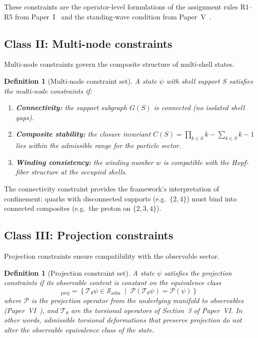 \documentclass[12pt]{article}
\newtheorem{definition}[theorem]{Definition}
\newcommand{\Pcal}{\mathcal{P}}
\newcommand{\Tcal}{\mathcal{T}}
\newcommand{\Sadm}{\mathcal{S}_{\mathrm{adm}}}
\begin{document}
These constraints are the operator-level formulations of the assignment rules R1--R5 from Paper~I~\citep{SmartI} and the standing-wave condition from Paper~V~\citep{SmartV}.

\subsection{Class II: Multi-node constraints}

Multi-node constraints govern the composite structure of multi-shell states.

\begin{definition}[Multi-node constraint set]\label{def:multinode}
A state $\psi$ with shell support $S$ satisfies the multi-node constraints if:
\begin{enumerate}
    \item \textbf{Connectivity:} the support subgraph $G(S)$ is connected (no isolated shell gaps).
    \item \textbf{Composite stability:} the closure invariant $C(S) = \prod_{k \in S} k - \sum_{k \in S} k - 1$ lies within the admissible range for the particle sector.
    \item \textbf{Winding consistency:} the winding number $w$ is compatible with the Hopf-fiber structure at the occupied shells.
\end{enumerate}
\end{definition}

The connectivity constraint provides the framework's interpretation of confinement: quarks with disconnected supports (e.g.\ $\{2,4\}$) must bind into connected composites (e.g.\ the proton on $\{2,3,4\}$).

\subsection{Class III: Projection constraints}

Projection constraints ensure compatibility with the observable sector.

\begin{definition}[Projection constraint set]\label{def:projection}
A state $\psi$ satisfies the projection constraints if its observable content is constant on the equivalence class
\begin{equation}
    [\psi]_{\mathrm{proj}} = \left\{\Tcal_\theta \psi \in \Sadm \;\middle|\; \Pcal(\Tcal_\theta \psi) = \Pcal(\psi)\right\}
\end{equation}
where $\Pcal$ is the projection operator from the underlying manifold to observables (Paper~VI~\citep{SmartVI}), and $\Tcal_\theta$ are the torsional operators of Section~3 of Paper~VI. In other words, admissible torsional deformations that preserve projection do not alter the observable equivalence class of the state.
\end{definition}
\end{document}

